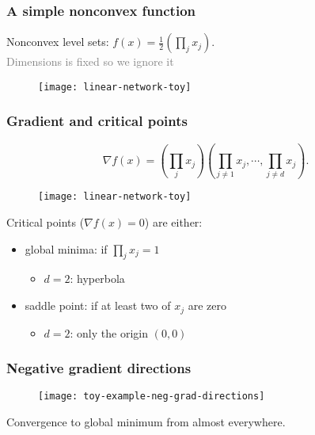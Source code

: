 \documentclass[aspectratio=149]{beamer}
\begin{document}
\begin{frame}
  \frametitle{A simple nonconvex function}
  Nonconvex level sets: $f(x)= \frac12 {\left( \prod_j x_j \right)}$. \\
  \textcolor{gray}{Dimensions is fixed so we ignore it}

  \begin{figure}[ht]
    \centering
    \texttt{[image: linear-network-toy]}
  \end{figure}

\end{frame}


\begin{frame}
  \frametitle{Gradient and critical points}

  \begin{equation}
    \nabla f(x) = \left( \prod_j x_j \right) \left( \prod_{j\neq1} x_j, \cdots, \prod_{j\neq d}x_j \right).
  \end{equation}
  \begin{minipage}{0.5\textwidth}
    \begin{figure}[ht]
      \centering
      \texttt{[image: linear-network-toy]}
    \end{figure}
  \end{minipage}
  \begin{minipage}{0.45\textwidth}
    Critical points ($\nabla f(x) = 0$) are either:
    \begin{itemize}
      \item global minima: if $\prod_j x_j = 1$
            \begin{itemize}
              \item $d=2$: hyperbola
            \end{itemize}
      \item saddle point: if at least two of $x_j$ are zero
            \begin{itemize}
              \item $d=2$: only the origin $(0,0)$
            \end{itemize}
    \end{itemize}
  \end{minipage}
\end{frame}


\begin{frame}
  \frametitle{Negative gradient directions}
  \begin{figure}[ht]
    \centering
    \texttt{[image: toy-example-neg-grad-directions]}
  \end{figure}
  Convergence to global minimum from almost everywhere.
\end{frame}
\end{document}
